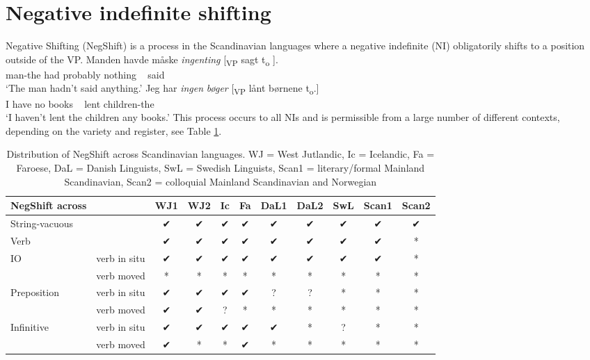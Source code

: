 \documentclass[12pt, letterpaper]{article}
\begin{document}
\section{Negative indefinite shifting} \label{sec:NEGSHIFT}
\ea Negative Shifting (NegShift) is a process in the Scandinavian languages where a negative indefinite (NI) obligatorily shifts to a position outside of the VP.
	\ea
	\gll Manden havde måske \textit{ingenting} [\textsubscript{VP} sagt t\textsubscript{o} ].\\
	man-the had probably nothing ~ said\\
	\glt `The man hadn't said anything.'
	\ex 
	\gll Jeg har \textit{ingen} \textit{bøger} [\textsubscript{VP} lånt børnene t\textsubscript{o}.]\\
	I have no books ~ lent children-the\\
	\glt `I haven't lent the children any books.'
	\z
\ex This process occurs to all NIs and is permissible from a large number of different contexts, depending on the variety and register, see Table \ref{tab:Distribution}. 
\begin{table}[h!]
	\centering
	\caption{Distribution of NegShift across Scandinavian languages. WJ = West Jutlandic, Ic = Icelandic, Fa = Faroese, DaL = Danish Linguists, SwL = Swedish Linguists, Scan1 = literary/formal Mainland Scandinavian, Scan2 = colloquial Mainland Scandinavian and Norwegian}
	\label{tab:Distribution}
\begin{tabular}{llccccccccc}
	\hline 
	NegShift across &  & WJ1 & WJ2 & Ic & Fa & DaL1 & DaL2 & SwL & Scan1 & Scan2 \\ 
	\hline 
	String-vacuous &  & ✔︎ & ✔︎ & ✔︎ & ✔︎ & ✔︎ & ✔︎ & ✔︎ & ✔︎ & ✔︎ \\ 
	Verb &  & ✔︎ & ✔︎ & ✔︎ & ✔︎ & ✔︎ & ✔︎ & ✔︎ & ✔︎ & * \\ 
	IO & verb in situ & ✔︎ & ✔︎ & ✔︎ & ✔︎ & ✔︎ & ✔︎ & ✔︎ & ✔︎ & * \\ 
	& verb moved & * & * & * & * & * & * & * & * & * \\ 
	Preposition & verb in situ & ✔︎ & ✔︎ & ✔︎ & ✔︎ & ? & ? & * & * & * \\ 
	& verb moved & ✔︎ & ✔︎ & ? & * & * & * & * & * & * \\ 
	Infinitive & verb in situ & ✔︎ & ✔︎ & ✔︎ & ✔︎ & ✔︎ & * & ? & * & * \\ 
	& verb moved & ✔︎ & * & * & ✔︎ & * & * & * & * & * \\ 
	\hline 
\end{tabular} 
\end{table}
\end{document}

